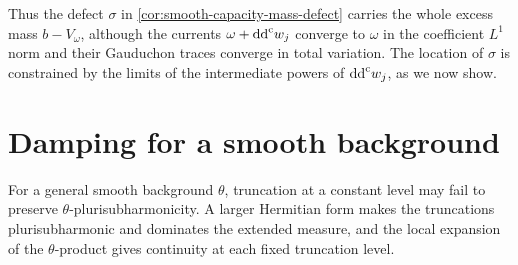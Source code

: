 Thus the defect $\sigma$ in \cref{cor:smooth-capacity-mass-defect} carries the whole excess mass $b-V_\omega$, although the currents $\omega+\mathrm{dd}^{\mathrm{c}} w_j$ converge to $\omega$ in the coefficient $L^1$ norm and their Gauduchon traces converge in total variation. The location of $\sigma$ is constrained by the limits of the intermediate powers of $\mathrm{dd}^{\mathrm{c}} w_j$, as we now show.



\section{Damping for a smooth background}

For a general smooth background $\theta$, truncation at a constant level may fail to preserve $\theta$-plurisubharmonicity. A larger Hermitian form makes the truncations plurisubharmonic and dominates the extended measure, and the local expansion of the $\theta$-product gives continuity at each fixed truncation level.

